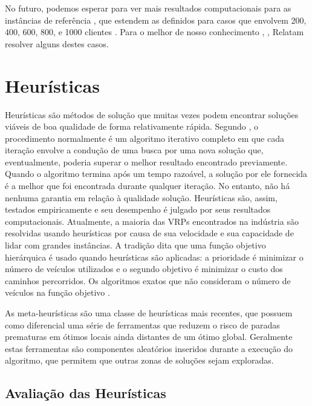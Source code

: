 No futuro, podemos esperar para ver mais resultados computacionais para as instâncias de referência \cite{gehring09}, que estendem as definidos para casos que envolvem 200, 400, 600, 800, e 1000 clientes . Para o melhor de nosso conhecimento \cite{larsen00},\cite{braysy02} \cite{cook99}, \cite{kallehauge06} Relatam resolver alguns destes casos.
 
\section{Heurísticas}

Heurísticas são métodos de solução que muitas vezes podem encontrar soluções viáveis de boa qualidade de forma relativamente rápida. Segundo \cite{hillier05}, o procedimento normalmente é um algoritmo iterativo completo em que cada iteração envolve a condução de uma busca por uma nova solução que, eventualmente, poderia superar o melhor resultado encontrado previamente. Quando o algoritmo termina após um tempo razoável, a solução por ele fornecida é a melhor que foi encontrada durante qualquer iteração. No entanto, não há nenhuma garantia em relação à qualidade solução. Heurísticas são, assim, testados empiricamente e seu desempenho é julgado por seus resultados computacionais. Atualmente, a maioria das VRPs encontrados na indústria são resolvidas usando heurísticas por causa de sua velocidade e sua capacidade de lidar com grandes instâncias. A tradição dita que uma função objetivo hierárquica é usado quando heurísticas são aplicadas: a prioridade é minimizar o número de veículos utilizados e o segundo objetivo é minimizar o custo dos caminhos percorridos. Os algoritmos exatos que não consideram o número de veículos na função objetivo \cite{braysy05}.

As meta-heurísticas são uma classe de heurísticas mais recentes, que possuem como diferencial uma série de ferramentas que reduzem o risco de paradas prematuras em ótimos locais ainda distantes de um ótimo global. Geralmente estas ferramentas são componentes aleatórios inseridos durante a execução do algoritmo, que permitem que outras zonas de soluções sejam exploradas.

\subsection{Avaliação das Heurísticas }


